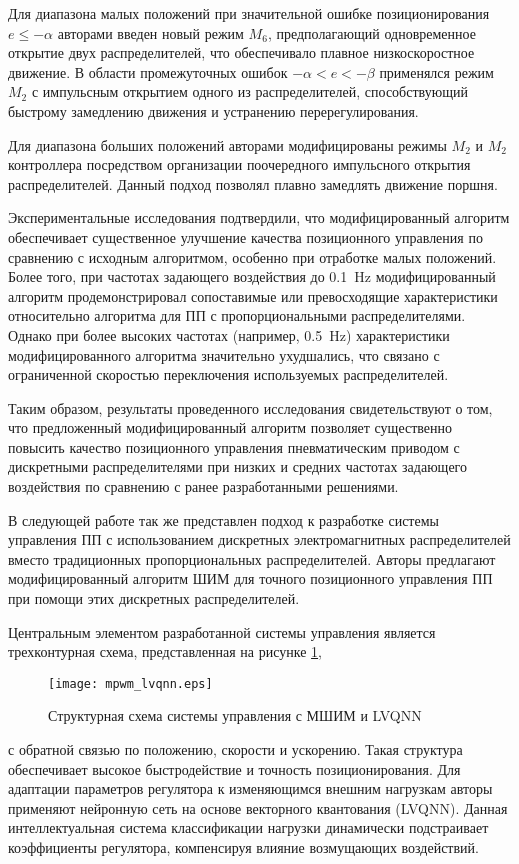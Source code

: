 Для диапазона малых положений при значительной ошибке позиционирования
$e \leqslant -\alpha$ авторами
введен новый режим $M_6$, предполагающий одновременное открытие двух распределителей, что обеспечивало
плавное низкоскоростное движение. В области промежуточных ошибок
$-\alpha < e < -\beta$ применялся режим
$M_2$ с импульсным открытием одного из распределителей, способствующий быстрому замедлению движения и
устранению перерегулирования.

Для диапазона больших положений авторами модифицированы режимы $M_2$ и $M_2$ контроллера
посредством организации поочередного импульсного открытия распределителей. Данный подход позволял
плавно замедлять движение поршня.

Экспериментальные исследования подтвердили, что модифицированный алгоритм обеспечивает
существенное улучшение качества позиционного управления по сравнению с исходным алгоритмом,
особенно при отработке малых положений. Более того, при частотах задающего воздействия
до \num{0.1}~\si{\hertz} модифицированный алгоритм продемонстрировал сопоставимые или превосходящие
характеристики относительно алгоритма для ПП с пропорциональными
распределителями. Однако при более высоких частотах (например, \num{0.5}~\si{\hertz}) характеристики модифицированного
алгоритма значительно ухудшались, что связано с ограниченной скоростью переключения
используемых распределителей.

Таким образом, результаты проведенного исследования свидетельствуют о том, что предложенный
модифицированный алгоритм позволяет существенно повысить качество позиционного управления
пневматическим приводом с дискретными распределителями при низких и средних частотах задающего
воздействия по сравнению с ранее разработанными решениями.

В следующей работе \cite*{AHN2005683} так же представлен подход к разработке системы управления ПП
с использованием дискретных электромагнитных распределителей вместо традиционных пропорциональных распределителей.
Авторы предлагают модифицированный алгоритм ШИМ для точного позиционного управления
ПП при помощи этих дискретных распределителей.

Центральным элементом разработанной системы управления является трехконтурная схема, представленная на рисунке
\cref*{fig:mpwm_lvqnn},
\begin{figure}[htpb]
    \centerfloat
    \texttt{[image: mpwm\_lvqnn.eps]}
    \caption{Структурная схема системы управления с МШИМ и LVQNN}\label{fig:mpwm_lvqnn}
\end{figure}
с обратной связью по положению, скорости и ускорению. Такая структура обеспечивает высокое быстродействие и
точность позиционирования. Для адаптации параметров регулятора к изменяющимся внешним нагрузкам авторы применяют
нейронную сеть на основе векторного квантования (LVQNN). Данная интеллектуальная система классификации нагрузки
динамически подстраивает коэффициенты регулятора, компенсируя влияние возмущающих воздействий.


